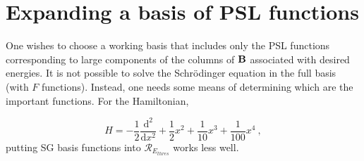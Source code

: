 %

\section{Expanding a  basis of PSL functions\label{sec.expand}}

%


One wishes to choose a working basis 
that includes only the PSL functions corresponding to  large components of  the     columns of ${\bf{    B  }} $  associated with  desired energies.
It is not possible to solve the Schr\"{o}dinger equation in the full basis (with   $F $ functions).  Instead, one needs some 
means of determining which are the important functions.  
%
%
%  
%
 For the Hamiltonian,     

\begin{equation}
H=-\dfrac{1}{2}\dfrac{\mathrm{d}^2}{\mathrm{d}x^2}+\dfrac{1}{2}x^2+\dfrac{1}
{10}x^3+\dfrac{1}{100}x^4~,
\end{equation} 
% 
%
putting SG basis functions into  $\mathcal{R}_{E_{thres}} $  works less well.  



